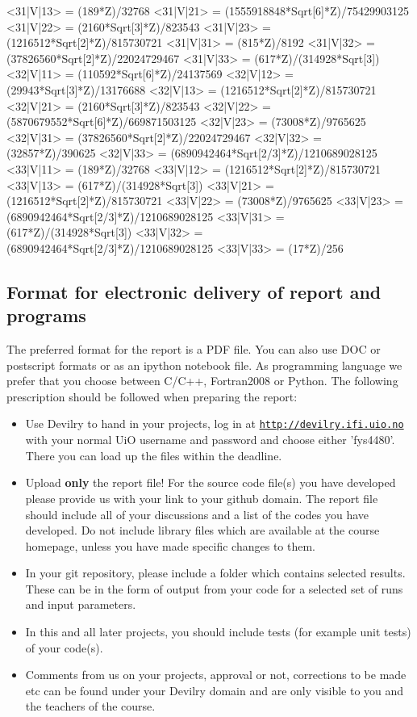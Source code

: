 \documentclass[%
oneside,                 %
final,                   %
10pt]{article}
\begin{document}
\begin{print}
<31|V|13> = (189*Z)/32768
<31|V|21> = (1555918848*Sqrt[6]*Z)/75429903125
<31|V|22> = (2160*Sqrt[3]*Z)/823543
<31|V|23> = (1216512*Sqrt[2]*Z)/815730721
<31|V|31> = (815*Z)/8192
<31|V|32> = (37826560*Sqrt[2]*Z)/22024729467
<31|V|33> = (617*Z)/(314928*Sqrt[3])
<32|V|11> = (110592*Sqrt[6]*Z)/24137569
<32|V|12> = (29943*Sqrt[3]*Z)/13176688
<32|V|13> = (1216512*Sqrt[2]*Z)/815730721
<32|V|21> = (2160*Sqrt[3]*Z)/823543
<32|V|22> = (5870679552*Sqrt[6]*Z)/669871503125
<32|V|23> = (73008*Z)/9765625
<32|V|31> = (37826560*Sqrt[2]*Z)/22024729467
<32|V|32> = (32857*Z)/390625
<32|V|33> = (6890942464*Sqrt[2/3]*Z)/1210689028125
<33|V|11> = (189*Z)/32768
<33|V|12> = (1216512*Sqrt[2]*Z)/815730721
<33|V|13> = (617*Z)/(314928*Sqrt[3])
<33|V|21> = (1216512*Sqrt[2]*Z)/815730721
<33|V|22> = (73008*Z)/9765625
<33|V|23> = (6890942464*Sqrt[2/3]*Z)/1210689028125
<33|V|31> = (617*Z)/(314928*Sqrt[3])
<33|V|32> = (6890942464*Sqrt[2/3]*Z)/1210689028125
<33|V|33> = (17*Z)/256
\end{print}





\subsection*{Format for electronic delivery of report and programs}

The preferred format for the report is a PDF file. You can also use DOC or postscript formats or as an ipython notebook file.  As programming language we prefer that you choose between C/C++, Fortran2008 or Python. The following prescription should be followed when preparing the report:

\begin{itemize}
  \item Use Devilry to hand in your projects, log in  at  \href{{http://devilry.ifi.uio.no}}{\nolinkurl{http://devilry.ifi.uio.no}} with your normal UiO username and password and choose either 'fys4480'. There you can load up the files within the deadline.

  \item Upload \textbf{only} the report file!  For the source code file(s) you have developed please provide us with your link to your github domain.  The report file should include all of your discussions and a list of the codes you have developed.  Do not include library files which are available at the course homepage, unless you have made specific changes to them.

  \item In your git repository, please include a folder which contains selected results. These can be in the form of output from your code for a selected set of runs and input parameters.

  \item In this and all later projects, you should include tests (for example unit tests) of your code(s).

  \item Comments  from us on your projects, approval or not, corrections to be made  etc can be found under your Devilry domain and are only visible to you and the teachers of the course.
\end{itemize}
\end{document}
